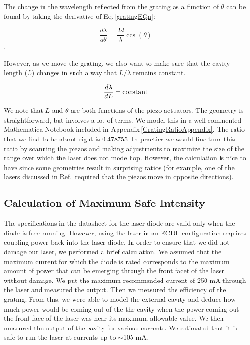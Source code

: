 The change in the wavelength reflected from the grating as a function of $\theta$ can be found by taking the derivative of Eq.\,\ref{gratingEQn}:

\begin{equation}
    \frac{d\lambda}{d \theta}= \frac{2d}{\lambda} \cos(\theta)
\end{equation}.

However, as we move the grating, we also want to make sure that the cavity length ($L$) changes in such a way that $L/\lambda$ remains constant. 

\begin{equation}
    \frac{d \lambda}{d L}= \textnormal{constant} 
\end{equation}

We note that $L$ and $\theta$ are both functions of the piezo actuators. The geometry is straightforward, but involves a lot of terms. We model this in a well-commented Mathematica Notebook included in Appendix\,\ref{GratingRatioAppendix}. The ratio that we find to be about right is 0.478755. In practice we would fine tune this ratio by scanning the piezos and making adjustments to maximize the size of the range over which the laser does not mode hop. However, the calculation is nice to have since some geometries result in surprising ratios (for example, one of the lasers discussed in Ref.\,\cite{cjeDiss} required that the piezos move in opposite directions).


\subsection{Calculation of Maximum Safe Intensity}

The specifications in the datasheet for the laser diode are valid only when the diode is free running. However, using the laser in an ECDL configuration requires coupling power back into the laser diode. In order to ensure that we did not damage our laser, we performed a brief calculation. We assumed that the maximum current for which the diode is rated corresponds to the maximum amount of power that can be emerging through the front facet of the laser without damage. We put the maximum recommended current of 250 mA through the laser and measured the output. Then we measured the efficiency of the grating. From this, we were able to model the external cavity and deduce how much power would be coming out of the the cavity when the power coming out the front face of the laser was near its maximum allowable value. We then measured the output of the cavity for various currents. We estimated that it is safe to run the laser at currents up to $\sim$105 mA. 

